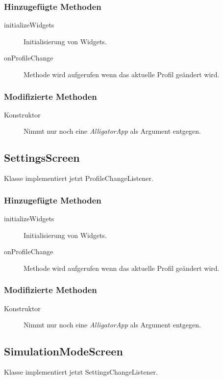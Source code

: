 \subsubsection{Hinzugefügte Methoden}
\begin{description}
\item[initializeWidgets]
Initialisierung von Widgets.
\item[onProfileChange]
Methode wird aufgerufen wenn das aktuelle Profil geändert wird.

\end{description}

\subsubsection{Modifizierte Methoden}
\begin{description}
\item[Konstruktor]
Nimmt nur noch eine \emph{AlligatorApp} als Argument entgegen.

\end{description}


\subsection{SettingsScreen}
Klasse implementiert jetzt ProfileChangeListener.
\subsubsection{Hinzugefügte Methoden}
\begin{description}
\item[initializeWidgets]
Initialisierung von Widgets.
\item[onProfileChange]
Methode wird aufgerufen wenn das aktuelle Profil geändert wird.


\end{description}

\subsubsection{Modifizierte Methoden}
\begin{description}
\item[Konstruktor]
Nimmt nur noch eine \emph{AlligatorApp} als Argument entgegen.

\end{description}


\subsection{SimulationModeScreen}
Klasse implementiert jetzt SettingsChangeListener.
